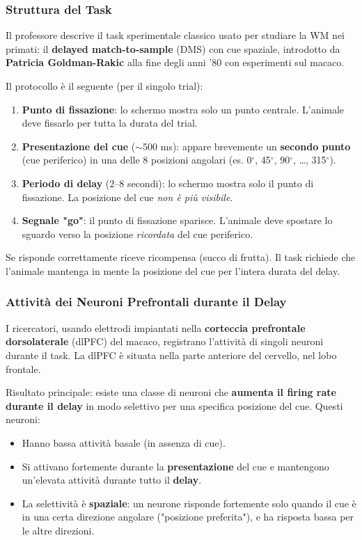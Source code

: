 \subsubsection{Struttura del Task}

Il professore descrive il task sperimentale classico usato per studiare la WM nei primati: il \textbf{delayed match-to-sample} (DMS) con cue spaziale, introdotto da \textbf{Patricia Goldman-Rakic} alla fine degli anni '80 con esperimenti sul macaco.

Il protocollo è il seguente (per il singolo trial):
\begin{enumerate}
    \item \textbf{Punto di fissazione}: lo schermo mostra solo un punto centrale. L'animale deve fissarlo per tutta la durata del trial.
    \item \textbf{Presentazione del cue} ($\sim$500 ms): appare brevemente un \textbf{secondo punto} (cue periferico) in una delle 8 posizioni angolari (es. 0$^\circ$, 45$^\circ$, 90$^\circ$, \dots, 315$^\circ$).
    \item \textbf{Periodo di delay} (2–8 secondi): lo schermo mostra solo il punto di fissazione. La posizione del cue \textit{non è più visibile}.
    \item \textbf{Segnale "go"}: il punto di fissazione sparisce. L'animale deve spostare lo sguardo verso la posizione \textit{ricordata} del cue periferico.
\end{enumerate}

Se risponde correttamente riceve ricompensa (succo di frutta). Il task richiede che l'animale mantenga in mente la posizione del cue per l'intera durata del delay.

\subsubsection{Attività dei Neuroni Prefrontali durante il Delay}

I ricercatori, usando elettrodi impiantati nella \textbf{corteccia prefrontale dorsolaterale} (dlPFC) del macaco, registrano l'attività di singoli neuroni durante il task. La dlPFC è situata nella parte anteriore del cervello, nel lobo frontale.

Risultato principale: esiste una classe di neuroni che \textbf{aumenta il firing rate durante il delay} in modo selettivo per una specifica posizione del cue. Questi neuroni:
\begin{itemize}
    \item Hanno bassa attività basale (in assenza di cue).
    \item Si attivano fortemente durante la \textbf{presentazione} del cue e mantengono un'elevata attività durante tutto il \textbf{delay}.
    \item La selettività è \textbf{spaziale}: un neurone risponde fortemente solo quando il cue è in una certa direzione angolare ("posizione preferita"), e ha risposta bassa per le altre direzioni.
\end{itemize}



